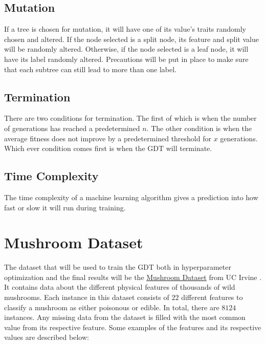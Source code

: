 \documentclass[12pt]{article}
\begin{document}
\subsection{Mutation}

If a tree is chosen for mutation, it will have one of its value's traits randomly chosen and altered. If the node selected is a split node, its feature and split value will be randomly altered. Otherwise, if the node selected is a leaf node, it will have its label randomly altered. Precautions will be put in place to make sure that each subtree can still lead to more than one label.

\subsection{Termination}

There are two conditions for termination. The first of which is when the number of generations has reached a predetermined $n$. The other condition is when the average fitness does not improve by a predetermined threshold for $x$ generations. Which ever condition comes first is when the GDT will terminate.

\subsection{Time Complexity}

The time complexity of a machine learning algorithm gives a prediction into how fast or slow it will run during training.

\section{Mushroom Dataset}

The dataset that will be used to train the GDT both in hyperparameter optimization and the final results will be the \href{https://archive-beta.ics.uci.edu/ml/datasets/mushroom}{Mushroom Dataset} from UC Irvine \cite{misc_mushroom_73}. It contains data about the different physical features of thousands of wild mushrooms. Each instance in this dataset consists of $22$ different features to classify a mushroom as either poisonous or edible. In total, there are $8124$ instances. Any missing data from the dataset is filled with the most common value from its respective feature. Some examples of the features and its respective values are described below:
\end{document}
